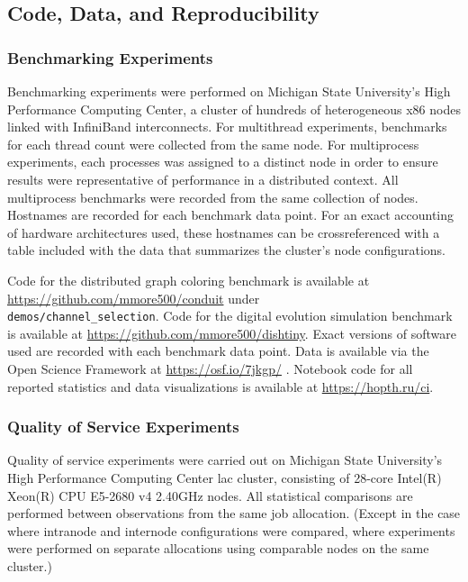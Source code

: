 \subsection{Code, Data, and Reproducibility}

\subsubsection{Benchmarking Experiments} \label{sec:methods-code-data-reproducibility-benchmarking-experiments}

Benchmarking experiments were performed on Michigan State University's High Performance Computing Center, a cluster of hundreds of heterogeneous x86 nodes linked with InfiniBand interconnects.
For multithread experiments, benchmarks for each thread count were collected from the same node.
For multiprocess experiments, each processes was assigned to a distinct node in order to ensure results were representative of performance in a distributed context.
All multiprocess benchmarks were recorded from the same collection of nodes.
Hostnames are recorded for each benchmark data point.
For an exact accounting of hardware architectures used, these hostnames can be crossreferenced with a table included with the data that summarizes the cluster's node configurations.

Code for the distributed graph coloring benchmark is available at \url{https://github.com/mmore500/conduit} under \\ \texttt{demos/channel\_selection}.
Code for the digital evolution simulation benchmark is available at \url{https://github.com/mmore500/dishtiny}.
Exact versions of software used are recorded with each benchmark data point.
Data is available via the Open Science Framework at \url{https://osf.io/7jkgp/} \citep{foster2017open}.
Notebook code for all reported statistics and data visualizations is available at \url{https://hopth.ru/ci}.

\subsubsection{Quality of Service Experiments}

Quality of service experiments were carried out on Michigan State University's High Performance Computing Center lac cluster, consisting of 28-core Intel(R) Xeon(R) CPU E5-2680 v4 \@ 2.40GHz nodes.
All statistical comparisons are performed between observations from the same job allocation.
(Except in the case where intranode and internode configurations were compared, where experiments were performed on separate allocations using comparable nodes on the same cluster.)

